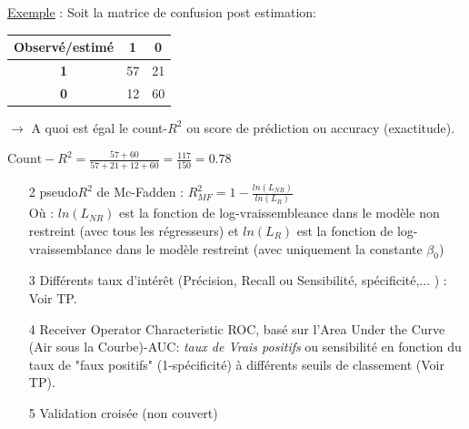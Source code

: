 \documentclass[12pt,aspectratio=1610]{beamer}
\begin{document}
\begin{frame}
	\underline{Exemple} : 
	Soit  la matrice de confusion post estimation:
	\begin{table}[]
		\begin{tabular}{|
				>{}c |c|c|}
			\hline
			\textbf{Observé/estimé} & \textbf{1} & \textbf{0} \\ \hline
			\textbf{1}              & 57                                 & 21                                 \\ \hline
			\textbf{0}              & 12                                 & 60                                 \\ \hline
		\end{tabular}
	\end{table}
	
	$\rightarrow$ A quoi est égal le count-$R^2$ ou  score de prédiction ou accuracy (exactitude).
	
	\pause 

$\text{Count}-R^2=\frac{57+60}{57+21+12+60}=\frac{117}{150}=0.78$

\vspace{0.5 cm}

\begin{enumerate}
	
 	\item[2] pseudo$R^2$ de Mc-Fadden  : $R^2_{MF}=1-\frac{ln(L_{NR})}{ln(L_R)}$\\
	Où :  $ln(L_{NR})$ est la fonction de log-vraissembleance dans le modèle non restreint (avec tous les régresseurs) et $ln(L_R)$ est la fonction de log-vraissemblance dans le modèle restreint (avec uniquement la constante $\beta_0$)
	


\end{enumerate}
\end{frame}


\begin{frame}
	\begin{enumerate}
		
	\item [3] Différents taux d'intérêt (Précision, Recall ou Sensibilité, spécificité,... ) : Voir TP.

	\item[4] Receiver Operator Characteristic ROC, basé sur l'Area Under the Curve  (Air sous la Courbe)-AUC: \textit{taux de Vrais positifs} ou sensibilité en fonction du taux de  "faux positifs" (1-spécificité) à différents seuils de classement (Voir TP).

	
	\item[5] Validation croisée (non couvert)
	
	
\end{enumerate}


\end{frame}
\end{document}
